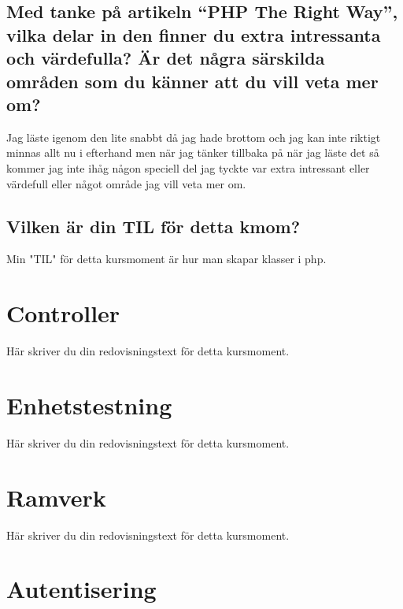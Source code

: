 \documentclass[oneside]{book}
\begin{document}
\section{Med tanke på artikeln “PHP The Right Way”,
vilka delar in den finner du extra intressanta och
värdefulla? Är det några särskilda områden som du känner att du vill veta mer om?}

Jag läste igenom den lite snabbt då jag hade brottom och jag kan inte riktigt minnas
allt nu i efterhand men när jag tänker tillbaka på när jag läste det så kommer jag
inte ihåg någon speciell del jag tyckte var extra intressant eller värdefull eller
något område jag vill veta mer om.

\section{Vilken är din TIL för detta kmom?}

Min "TIL" för detta kursmoment är hur man skapar klasser i php.

\section{}



\chapter{Controller}

Här skriver du din redovisningstext för detta kursmoment.



\chapter{Enhetstestning}

Här skriver du din redovisningstext för detta kursmoment.



\chapter{Ramverk}

Här skriver du din redovisningstext för detta kursmoment.



\chapter{Autentisering}
\end{document}
